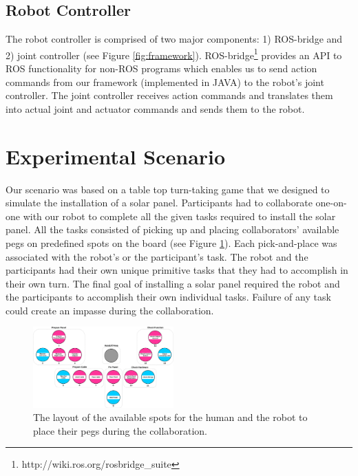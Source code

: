 \documentclass{sig-alternate-05-2015}
\begin{document}
\subsection{Robot Controller}
The robot controller is comprised of two major components: 1) ROS-bridge and 2)
joint controller (see Figure \ref{fig:framework}).
ROS-bridge\footnote{http://wiki.ros.org/rosbridge\_suite} provides an API to ROS
functionality for non-ROS programs which enables us to send action commands from
our framework (implemented in JAVA) to the robot's joint controller. The joint
controller receives action commands and translates them into actual joint and
actuator commands and sends them to the robot.

\section{Experimental Scenario}

Our scenario was based on a table top turn-taking game that we designed to
simulate the installation of a solar panel. Participants had to collaborate
one-on-one with our robot to complete all the given tasks required to install
the solar panel. All the tasks consisted of picking up and placing
collaborators' available pegs on predefined spots on the board (see Figure
\ref{fig:game_board}). Each pick-and-place was associated with the robot's or
the participant's task. The robot and the participants had their own unique
primitive tasks that they had to accomplish in their own turn. The final goal of
installing a solar panel required the robot and the participants to accomplish
their own individual tasks. Failure of any task could create an impasse during
the collaboration.

\begin{figure}[tbh]
  \centering
  \includegraphics[width=0.48\textwidth]{figure/gameBoard.pdf}
  \caption{The layout of the available spots for the human and the robot to
  place their pegs during the collaboration.}
  \label{fig:game_board}
  \vspace*{-3mm}
\end{figure}
\end{document}
